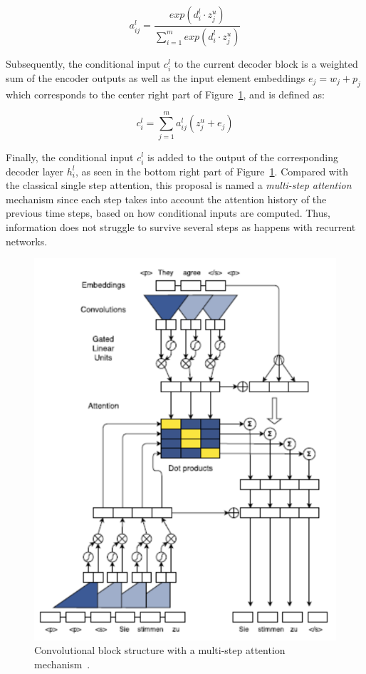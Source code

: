 \[
    a_{ij}^l = \frac{exp(d_i^l \cdot z_j^u)}{\sum_{i=1}^m exp(d_i^l \cdot z_j^u)}
\]

Subsequently, the conditional input $c_i^l$ to the current decoder block is a weighted sum of 
the encoder outputs as well as the input element embeddings $e_j = w_j + p_j$ which corresponds 
to the center right part of Figure~\ref{fig:convBlockStruct}, and is defined as:

\[
    c_i^l = \sum_{j=1}^m a_{ij}^l (z_j^u + e_j)
\]

Finally, the conditional input $c_i^l$ is added to the output of the corresponding decoder layer 
$h_i^l$, as seen in the bottom right part of Figure~\ref{fig:convBlockStruct}. Compared with the 
classical single step attention, this proposal is named a \textit{multi-step attention} mechanism 
since each step takes into account the attention history of the previous time steps, based on how 
conditional inputs are computed. Thus, information does not struggle to survive several steps 
as happens with recurrent networks.

\begin{figure}[!h]
    \centering
    \includegraphics[scale=.5]{imagenes/2_theorical_framework/semantic_parsing/conS2SModel.PNG}
    \caption{Convolutional block structure with a multi-step attention mechanism~\cite{nmt:convS2S-GehringAGYD17}.}
    \label{fig:convBlockStruct}
\end{figure}

